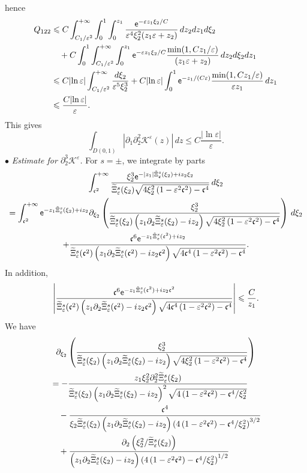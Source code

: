 \documentclass[AHL,Unicode,longabstracts,published]{cedram}
\newcommand*\p{\partial}
\newcommand*\BK{\mathcal{K}}
\newcommand*\ex{{\sf e}}
\newcommand*\cs{{\mathfrak c}}
\newcommand*\ii{\infty}
\newcommand*\ls{\leqslant }
\newcommand*\e{\varepsilon}
\newcommand*\lne{\lvert \ln \varepsilon \rvert}
\renewcommand*\t{\tilde}
\let\oldtilde\tilde
\renewcommand*{\tilde}[1]{\mathchoice{\widetilde{#1}}{\widetilde{#1}}{\oldtilde{#1}}{\oldtilde{#1}}}
\begin{document}
hence
\begin{align*}
Q_{122} & \ls C \int_{C_1 / \e^{2}}^{+\ii} \int_0^{1} \int_0^{z_1}
\frac{ \ex^{- \e z_1 \xi_2 /C} }{ \e^4 \xi_2^2 (z_1 \e + z_2) } \, dz_2 dz_1d\xi_2
\\ & \quad + C \int_0^{1} \int_{C_1 / \e^{2}}^{+\ii} \int_0^{z_1} \ex^{- \e z_1 \xi_2 /C} \frac{ \min (1, Cz_1 / \e) }{(z_1 \e + z_2)} \, dz_2 d\xi_2 dz_1
\\ & \ls C \lne \int_{ C_1 / \e^{2}}^{+\ii} \frac{ d\xi_2 }{ \e^5 \xi_2^3 } + C \lne \int_0^{1} \ex^{- z_1 /(C \e)} \frac{ \min (1, Cz_1 / \e) }{ \e z_1 } \, dz_1
\\ &
\ls \frac{C \lne }{\e}.
\end{align*}
This gives
\[
\int_{D(0,1)} \left\lvert \p_1 \p_2^2 \BK^\e (z) \right\rvert \, dz
\ls C \frac{ \lvert \ln \e \rvert }{ \e }.
\]
\noindent $ \bullet $ \emph{Estimate for $ \p_2^3 \BK^\e $.} For $ s = \pm $, we integrate by parts
\begin{multline}\label{IPP_K222_zero}
\int_{ \cs^2}^{+\ii} \frac{ \xi_2^3 \ex^{- |z_1| \t\Xi_\e^s (\xi_2) + i z_2 \xi_2} }{
\t\Xi_\e^s (\xi_2) \sqrt{4 \xi_2^2 \left(1 - \e^2 \cs^2\right) - \cs^4}} \, d\xi_2\\ 
 =
\int_{ \cs^2}^{+\ii} \ex^{- z_1 \t\Xi_\e^s (\xi_2) + i z_2 }
\p_{\xi_2} \left(\frac{ \xi_2^3 }{ \t\Xi_\e^s (\xi_2)\left(z_1 \p_2 \t\Xi_\e^s (\xi_2) - i z_2\right) \sqrt{ 4 \xi_2^2 \left(1 - \e^2 \cs^2\right) - \cs^4}} \right) \, d\xi_2\\ 
+ \frac{ \cs^6 \ex^{- z_1 \t\Xi_\e^s (\cs^2) + i z_2 } }{ \t\Xi_\e^s (\cs^2) \left(z_1 \p_2 \t\Xi_\e^s (\cs^2) - i z_2 \cs^2\right) \sqrt{4 \cs^4 \left(1 - \e^2 \cs^2\right) - \cs^4}}.
\end{multline}
In addition,
\begin{align*}
\left\lvert
\frac{ \cs^6 \ex^{- z_1 \t\Xi_\e^s (\cs^2) + i z_2 \cs^2} }{ \t\Xi_\e^s (\cs^2)\left(z_1 \p_2 \t\Xi_\e^s (\cs^2) - i z_2 \cs^2\right)
\sqrt{ 4 \cs^4 \left(1 - \e^2 \cs^2\right) - \cs^4}} \right\rvert
\ls \frac{C}{z_1}.
\end{align*}
We have
\begin{multline*}
\p_{\xi_2} \left(\frac{ \xi_2^3 }{ \t\Xi_\e^s (\xi_2)\left(z_1 \p_2 \t\Xi_\e^s (\xi_2) - i z_2\right) \sqrt{ 4 \xi_2^2 \left(1 - \e^2 \cs^2\right) - \cs^4}} \right)
\\
\begin{aligned}
 & = - \frac{ z_1 \xi_2^2 \p_2^2 \t\Xi_\e^s (\xi_2) }{ \t\Xi_\e^s (\xi_2) \left(z_1 \p_2 \t\Xi_\e^s (\xi_2) - i z_2\right)^2 \sqrt{4\left(1 - \e^2 \cs^2\right) - \cs^4 / \xi_2^2} }
\\ & \quad - \frac{ \cs^4 }{ \xi_2 \t\Xi_\e^s (\xi_2) \left(z_1 \p_2 \t\Xi_\e^s (\xi_2) - i z_2\right) \left(4 \left(1 - \e^2 \cs^2\right) - \cs^4 /\xi_2^2\right)^{3/2} }
\\ & \quad + \frac{ \p_2 \left(\xi_2^2 / \t\Xi_\e^s (\xi_2)\right) }{\left(z_1 \p_2 \t\Xi_\e^s (\xi_2) - i z_2\right) \left(4 \left(1 - \e^2 \cs^2\right) - \cs^4 /\xi_2^2\right)^{1/2} }
\end{aligned}
\end{multline*}
\end{document}
